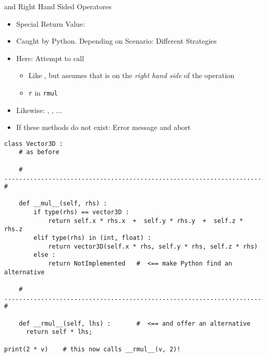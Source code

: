 
\begin{frame}[fragile]{ and Right Hand Sided Operatores}
%
\begin{itemize}
\item Special Return Value: 
\item Caught by Python. Depending on Scenario: Different Strategies
\item Here: Attempt to call 
	\begin{itemize}
	\item Like , but assumes that  is on the \emph{right hand side} of the operation
	\item[\Thus] \texttt{r} in \texttt{rmul}
	\end{itemize}
\item Likewise: , , ...
\item If these methods do not exist: Error message and abort
\end{itemize}
%
\end{frame}


\begin{frame}[fragile]
%
\begin{codebox}
\begin{verbatim}
class Vector3D :
    # as before
    
    # ........................................................................ #
    
    def __mul__(self, rhs) :
        if type(rhs) == vector3D :
            return self.x * rhs.x  +  self.y * rhs.y  +  self.z * rhs.z
        elif type(rhs) in (int, float) :
            return vector3D(self.x * rhs, self.y * rhs, self.z * rhs)
        else :
            return NotImplemented   #  <== make Python find an alternative
    
    # ........................................................................ #
    
    def __rmul__(self, lhs) :       #  <== and offer an alternative
      return self * lhs;

print(2 * v)    # this now calls __rmul__(v, 2)!
\end{verbatim}
\end{codebox}
%
\end{frame}

